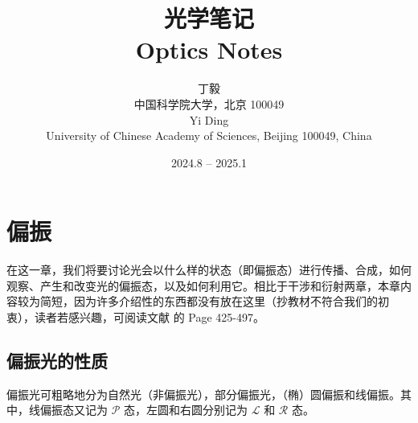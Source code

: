 \documentclass[UTF8]{report}
\title{光学笔记\\Optics Notes}
\author{丁毅\\ \footnotesize 中国科学院大学，北京 100049\\ Yi Ding \\ \footnotesize University of Chinese Academy of Sciences, Beijing 100049, China}
\date{\footnotesize 2024.8 -- 2025.1}
\theoremstyle{MyLineTheoremStyle} %
\theoremstyle{MyBlockTheoremStyle} %
\theoremstyle{MySubsubsectionStyle} %
\begin{document}
 

\maketitle\newpage  
{} %
\thispagestyle{fancy}   %

\setcounter{tocdepth}{2}                %
\tableofcontents                        %
\thispagestyle{fancy}                   %

\newpage    
{} 





\chapter{偏振}\thispagestyle{fancy}
在这一章，我们将要讨论光会以什么样的状态（即偏振态）进行传播、合成，如何观察、产生和改变光的偏振态，以及如何利用它。相比于干涉和衍射两章，本章内容较为简短，因为许多介绍性的东西都没有放在这里（抄教材不符合我们的初衷），读者若感兴趣，可阅读文献 \cite{Optics} 的 Page 425-497。

\section{偏振光的性质}
偏振光可粗略地分为自然光（非偏振光），部分偏振光，（椭）圆偏振和线偏振。其中，线偏振态又记为 $\mathscr{P}$ 态，左圆和右圆分别记为 $\mathscr{L}$ 和 $\mathscr{R}$ 态。
\end{document}
